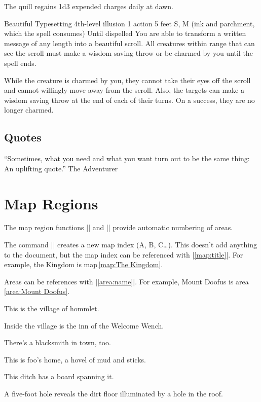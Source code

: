 \documentclass[letterpaper,twocolumn,openany,nodeprecatedcode]{dndbook}
\begin{document}
The quill regains 1d3 expended charges daily at dawn.

\DndSpellHeader%
  {Beautiful Typesetting}
  {4th-level illusion}
  {1 action}
  {5 feet}
  {S, M (ink and parchment, which the spell consumes)}
  {Until dispelled}
You are able to transform a written message of any length into a beautiful scroll. All creatures within range that can see the scroll must make a wisdom saving throw or be charmed by you until the spell ends.

While the creature is charmed by you, they cannot take their eyes off the scroll and cannot willingly move away from the scroll. Also, the targets can make a wisdom saving throw at the end of each of their turns. On a success, they are no longer charmed.

\subsection{Quotes}
\DndQuote%
  {``Sometimes, what you need and what you}
  {want turn out to be the same thing: An uplifting quote.''}
  {The Adventurer}

\section{Map Regions}
The map region functions |\DndArea| and |\DndSubArea| provide automatic numbering of areas.

The command || creates a new map index (A, B, C\ldots). This doesn't add anything to the document, but the map index can be referenced with |\ref{map:title}|. For example, the Kingdom is map\,\ref{map:The Kingdom}.


Areas can be references with |\ref{area:name}|. For example, Mount Doofus is area \ref{area:Mount Doofus}.

This is the village of hommlet.

Inside the village is the inn of the Welcome Wench.

There's a blacksmith in town, too.

This is foo's home, a hovel of mud and sticks.

This ditch has a board spanning it.

A five-foot hole reveals the dirt floor illuminated by a hole in the roof.
\end{document}
